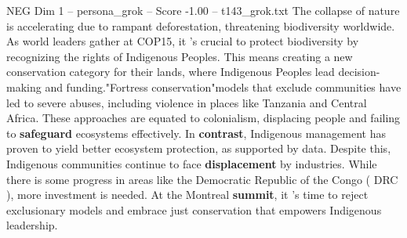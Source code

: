 \begin{textsample}{NEG Dim 1 – persona\_grok – Score -1.00 – t143\_grok.txt}  \label{ex:f1_neg_030}
The collapse of nature is accelerating due to rampant deforestation, threatening biodiversity worldwide.
As world leaders gather at COP15, it 's crucial to protect biodiversity by recognizing the rights of Indigenous Peoples.
This means creating a new conservation category for their lands, where Indigenous Peoples lead decision-making and funding."Fortress conservation"models that exclude communities have led to severe abuses, including violence in places like Tanzania and Central Africa.
These approaches are equated to colonialism, displacing people and failing to \textbf{safeguard} ecosystems effectively.
In \textbf{contrast}, Indigenous management has proven to yield better ecosystem protection, as supported by data.
Despite this, Indigenous communities continue to face \textbf{displacement} by industries.
While there is some progress in areas like the Democratic Republic of the Congo ( DRC ), more investment is needed.
At the Montreal \textbf{summit}, it 's time to reject exclusionary models and embrace just conservation that empowers Indigenous leadership.

\end{textsample}

